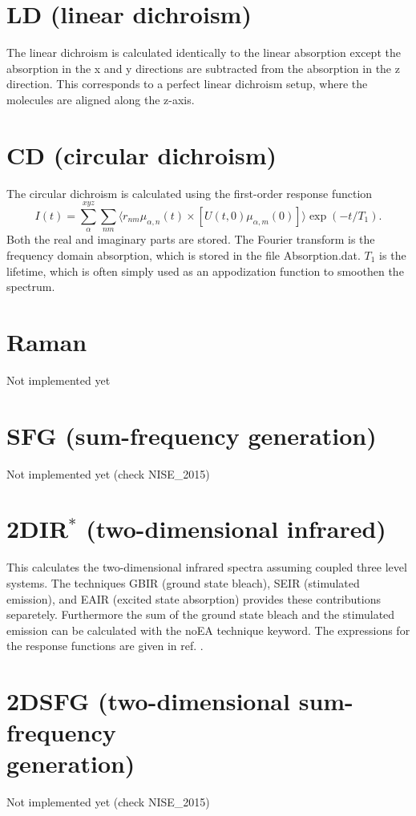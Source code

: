 \section{LD (linear dichroism)}
The linear dichroism is calculated identically to the linear absorption except the absorption in the x and y directions are subtracted from the absorption in the z direction. This corresponds to a perfect linear dichroism setup, where the molecules are aligned along the z-axis.
\section{CD (circular dichroism)}
The circular dichroism is calculated using the first-order response function
\begin{equation}
	I(t)=\sum_{\alpha}^{xyz}\sum_{nm}\langle r_{nm}\mu_{\alpha,n}(t)\times[U(t,0)\mu_{\alpha,m}(0)]\rangle\exp(-t/T_1).
\end{equation}
Both the real and imaginary parts are stored. The Fourier transform is the frequency domain absorption, which is stored in the file Absorption.dat. $T_1$ is the lifetime, which is often simply used as an appodization function to smoothen the spectrum.
\section{Raman}
Not implemented yet
\section{SFG (sum-frequency generation)}
Not implemented yet (check NISE\_2015)
\section{2DIR$^{*}$ (two-dimensional infrared)}
This calculates the two-dimensional infrared spectra assuming coupled three level systems. The techniques GBIR (ground state bleach), SEIR (stimulated emission), and EAIR (excited state absorption) provides these contributions separetely. Furthermore the sum of the ground state bleach and the stimulated emission can be calculated with the noEA technique keyword. The expressions for the response functions are given in ref. \cite{Jansen.2006.JPCB.110.22910}.
\section{2DSFG (two-dimensional sum-frequency\\ generation)}
 Not implemented yet (check NISE\_2015)

